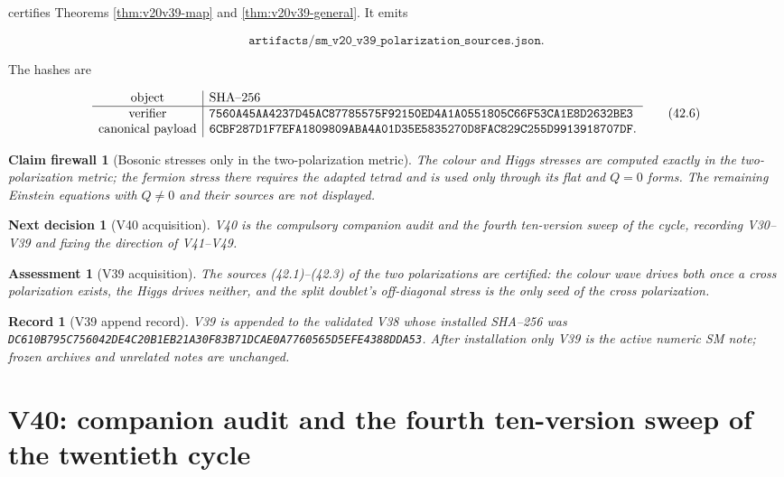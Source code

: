 \documentclass[11pt]{article}
\newtheorem{firewall}[theorem]{Claim firewall}
\newtheorem{decision}[theorem]{Next decision}
\newtheorem{assessment}[theorem]{Assessment}
\newtheorem{record}[theorem]{Record}
\theoremstyle{remark}
\begin{document}
certifies Theorems \ref{thm:v20v39-map} and \ref{thm:v20v39-general}.
It emits

\[
 \texttt{artifacts/sm\_v20\_v39\_polarization\_sources.json}.         \tag{42.5}
\]

The hashes are

\[
\begin{array}{c|l}
\hbox{object}&\hbox{SHA--256}\\ \hline
\hbox{verifier}&
\texttt{7560A45AA4237D45AC87785575F92150ED4A1A0551805C66F53CA1E8D2632BE3}\\
\hbox{canonical payload}&
\texttt{6CBF287D1F7EFA1809809ABA4A01D35E5835270D8FAC829C255D9913918707DF}.
\end{array}                                                     \tag{42.6}
\]

\begin{firewall}[Bosonic stresses only in the two-polarization metric]
\label{fire:v20v39}
The colour and Higgs stresses are computed exactly in the
two-polarization metric; the fermion stress there requires the
adapted tetrad and is used only through its flat and \(Q=0\) forms.
The remaining Einstein equations with \(Q\neq0\) and their sources
are not displayed.
\end{firewall}

\begin{decision}[V40 acquisition]
\label{dec:v20v39-next}
V40 is the compulsory companion audit and the fourth ten-version
sweep of the cycle, recording V30--V39 and fixing the direction of
V41--V49.
\end{decision}

\begin{assessment}[V39 acquisition]
\label{ass:v20v39}
The sources (42.1)--(42.3) of the two polarizations are certified:
the colour wave drives both once a cross polarization exists, the
Higgs drives neither, and the split doublet's off-diagonal stress is
the only seed of the cross polarization.
\end{assessment}

\begin{record}[V39 append record]
\label{rec:v20v39}
V39 is appended to the validated V38 whose installed SHA--256 was
\texttt{DC610B795C756042DE4C20B1EB21A30F83B71DCAE0A7760565D5EFE4388DDA53}.
After installation only V39 is the active numeric SM note; frozen
archives and unrelated notes are unchanged.
\end{record}


\section{V40: companion audit and the fourth ten-version sweep of the twentieth cycle}
\label{sec:v20v40}
\end{document}
